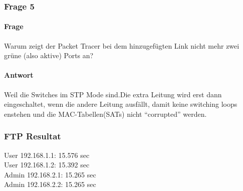 \subsubsection{Frage 5}
\paragraph{Frage}
Warum zeigt der Packet Tracer bei dem hinzugefügten Link nicht mehr
zwei grüne (also aktive) Ports an?
\paragraph{Antwort}
Weil die Switches im STP Mode sind.Die extra Leitung wird erst dann eingeschaltet, wenn die andere Leitung ausfällt, damit keine switching loops enstehen und die MAC-Tabellen(SATs) nicht ``corrupted'' werden.
\subsubsection{FTP Resultat}
User 192.168.1.1: 15.576 sec\\
User 192.168.1.2: 15.392 sec\\
Admin 192.168.2.1: 15.265 sec\\
Admin 192.168.2.2: 15.265 sec\\
